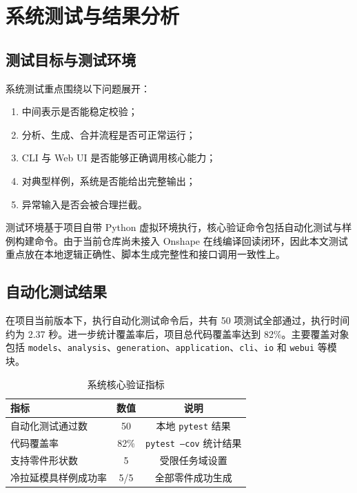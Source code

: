 \section{系统测试与结果分析}

\subsection{测试目标与测试环境}

系统测试重点围绕以下问题展开：
\begin{enumerate}[leftmargin=2em]
  \item 中间表示是否能稳定校验；
  \item 分析、生成、合并流程是否可正常运行；
  \item CLI 与 Web UI 是否能够正确调用核心能力；
  \item 对典型样例，系统是否能给出完整输出；
  \item 异常输入是否会被合理拦截。
\end{enumerate}

测试环境基于项目自带 Python 虚拟环境执行，核心验证命令包括自动化测试与样例构建命令。由于当前仓库尚未接入 Onshape 在线编译回读闭环，因此本文测试重点放在本地逻辑正确性、脚本生成完整性和接口调用一致性上。

\subsection{自动化测试结果}

在项目当前版本下，执行自动化测试命令后，共有 50 项测试全部通过，执行时间约为 2.37 秒。进一步统计覆盖率后，项目总代码覆盖率达到 82\%。主要覆盖对象包括 \texttt{models}、\texttt{analysis}、\texttt{generation}、\texttt{application}、\texttt{cli}、\texttt{io} 和 \texttt{webui} 等模块。

\begin{table}[H]
  \centering
  \caption{系统核心验证指标}
  \label{tab:main-metrics}
  \begin{tabular}{p{5.2cm}cc}
    \toprule
    指标 & 数值 & 说明 \\
    \midrule
    自动化测试通过数 & 50 & 本地 \texttt{pytest} 结果 \\
    代码覆盖率 & 82\% & \texttt{pytest --cov} 统计结果 \\
    支持零件形状数 & 5 & 受限任务域设置 \\
    冷拉延模具样例成功率 & 5/5 & 全部零件成功生成 \\
    \bottomrule
  \end{tabular}
\end{table}

